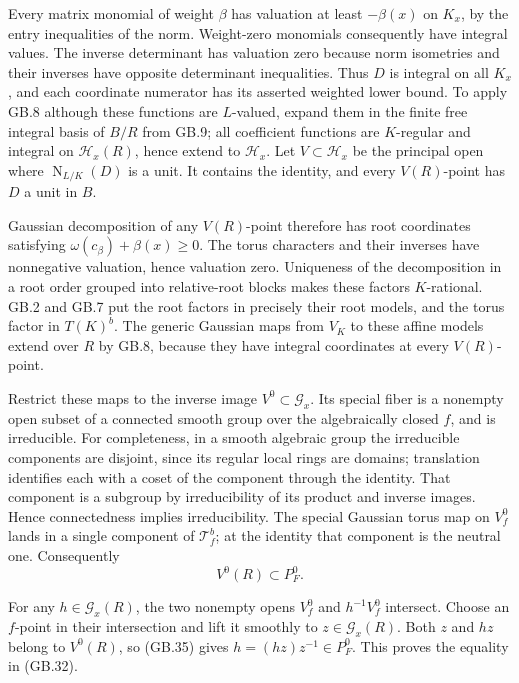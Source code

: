 \documentclass[
  11pt,
]{article}
\begin{document}
Every matrix monomial of weight \(\beta\) has valuation at least
\(-\beta(x)\) on \(K_x\), by the entry inequalities of the norm.
Weight-zero monomials consequently have integral values. The inverse
determinant has valuation zero because norm isometries and their
inverses have opposite determinant inequalities. Thus \(D\) is integral
on all \(K_x\), and each coordinate numerator has its asserted weighted
lower bound. To apply GB.8 although these functions are \(L\)-valued,
expand them in the finite free integral basis of \(B/R\) from GB.9; all
coefficient functions are \(K\)-regular and integral on
\(\mathcal H_x(R)\), hence extend to \(\mathcal H_x\). Let
\(V\subset\mathcal H_x\) be the principal open where
\(\operatorname {N}_{L/K}(D)\) is a unit. It contains the identity, and
every \(V(R)\)-point has \(D\) a unit in \(B\).

Gaussian decomposition of any \(V(R)\)-point therefore has root
coordinates satisfying \(\omega(c_\beta)+\beta(x)\geq0\). The torus
characters and their inverses have nonnegative valuation, hence
valuation zero. Uniqueness of the decomposition in a root order grouped
into relative-root blocks makes these factors \(K\)-rational. GB.2 and
GB.7 put the root factors in precisely their root models, and the torus
factor in \(T(K)^b\). The generic Gaussian maps from \(V_K\) to these
affine models extend over \(R\) by GB.8, because they have integral
coordinates at every \(V(R)\)-point.

Restrict these maps to the inverse image \(V^0\subset\mathcal G_x\). Its
special fiber is a nonempty open subset of a connected smooth group over
the algebraically closed \(f\), and is irreducible. For completeness, in
a smooth algebraic group the irreducible components are disjoint, since
its regular local rings are domains; translation identifies each with a
coset of the component through the identity. That component is a
subgroup by irreducibility of its product and inverse images. Hence
connectedness implies irreducibility. The special Gaussian torus map on
\(V^0_f\) lands in a single component of \(\mathcal T^b_f\); at the
identity that component is the neutral one. Consequently \[
 V^0(R)\subset P_F^0.
 \tag{GB.35}
\]

For any \(h\in\mathcal G_x(R)\), the two nonempty opens \(V^0_f\) and
\(h^{-1}V^0_f\) intersect. Choose an \(f\)-point in their intersection
and lift it smoothly to \(z\in\mathcal G_x(R)\). Both \(z\) and \(hz\)
belong to \(V^0(R)\), so (GB.35) gives \(h=(hz)z^{-1}\in P_F^0\). This
proves the equality in (GB.32).
\end{document}
